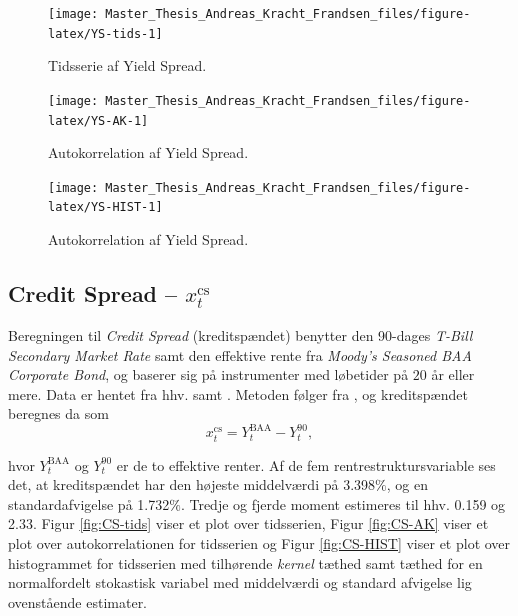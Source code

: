 \documentclass[
  a4paper,
  oneside]{memoir}
\begin{document}
\begin{figure}[htbp!]

{\centering \texttt{[image: Master\_Thesis\_Andreas\_Kracht\_Frandsen\_files/figure-latex/YS-tids-1]} 

}

\caption{Tidsserie af Yield Spread.}\label{fig:YS-tids}
\end{figure}

\begin{figure}[htbp!]

{\centering \texttt{[image: Master\_Thesis\_Andreas\_Kracht\_Frandsen\_files/figure-latex/YS-AK-1]} 

}

\caption{Autokorrelation af Yield Spread.}\label{fig:YS-AK}
\end{figure}

\begin{figure}[htbp!]

{\centering \texttt{[image: Master\_Thesis\_Andreas\_Kracht\_Frandsen\_files/figure-latex/YS-HIST-1]} 

}

\caption{Autokorrelation af Yield Spread.}\label{fig:YS-HIST}
\end{figure}

\hypertarget{credit-spread-x_ttextcs}{%
\subsection{\texorpdfstring{Credit Spread -- \(x_t^{\text{cs}}\)}{Credit Spread -- x\_t\^{}\{\textbackslash text\{cs\}\}}}\label{credit-spread-x_ttextcs}}

Beregningen til \emph{Credit Spread} (kreditspændet) benytter den 90-dages \emph{T-Bill} \emph{Secondary Market Rate} samt den effektive rente fra \emph{Moody's Seasoned BAA Corporate Bond}, og baserer sig på instrumenter med løbetider på \(20\) år eller mere. Data er hentet fra hhv. \citep{FRED902020} samt \citep{Goyal2007}. Metoden følger fra \citep{Keim1986}, og kreditspændet beregnes da som
\[x_t^{\text{cs}}=Y_t^{\text{BAA}}-Y_t^{90},\]

hvor \(Y_t^{\text{BAA}}\) og \(Y_t^{90}\) er de to effektive renter. Af de fem rentrestruktursvariable ses det, at kreditspændet har den højeste middelværdi på 3.398\(\%\), og en standardafvigelse på 1.732\(\%\). Tredje og fjerde moment estimeres til hhv. 0.159 og 2.33. Figur \ref{fig:CS-tids} viser et plot over tidsserien, Figur \ref{fig:CS-AK} viser et plot over autokorrelationen for tidsserien og Figur \ref{fig:CS-HIST} viser et plot over histogrammet for tidsserien med tilhørende \emph{kernel} tæthed samt tæthed for en normalfordelt stokastisk variabel med middelværdi og standard afvigelse lig ovenstående estimater.
\end{document}
